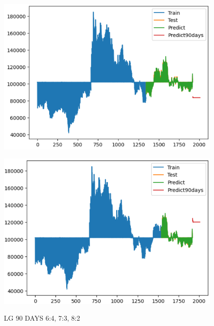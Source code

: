\documentclass{article}
\begin{document}
\begin{multicols}{2}
\begin{figure}[H]
\begin{minipage}{0.15\textwidth}
    \label{fig:1}
    \end{minipage}%
    \begin{minipage}{0.15\textwidth}
    \centering
    \includegraphics[width=1\textwidth]{Image/XGBoost/LG_7_3_90.png}
  
    \label{fig:2}
    \end{minipage}%
    \begin{minipage}{0.15\textwidth}
    \centering
    \includegraphics[width=1\textwidth]{Image/XGBoost/LG_8_2_90.png}

    \label{fig:3}
    \end{minipage}
    \caption{LG 90 DAYS  6:4, 7:3, 8:2 }
\end{figure}



\end{multicols}
\end{document}
